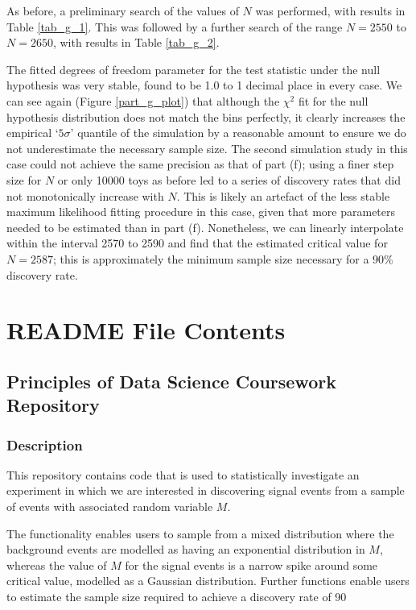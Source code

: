 \documentclass[12pt]{article}
\begin{document}
As before, a preliminary search of the values of $N$ was performed, with results in Table \ref{tab_g_1}.
This was followed by a further search of the range $N=2550$ to $N=2650$, with results in Table \ref{tab_g_2}.

The fitted degrees of freedom parameter for the test statistic under the null hypothesis was very stable, found to be 1.0 to 1 decimal place in every case.
We can see again (Figure \ref{part_g_plot}) that although the $\chi^2$ fit for the null hypothesis distribution does not match the bins perfectly, it clearly increases the empirical `$5\sigma$' quantile of the simulation by a reasonable amount to ensure we do not underestimate the necessary sample size.
The second simulation study in this case could not achieve the same precision as that of part (f); using a finer step size for $N$ or only 10000 toys as before led to a series of discovery rates that did not monotonically increase with $N$.
This is likely an artefact of the less stable maximum likelihood fitting procedure in this case, given that more parameters needed to be estimated than in part (f).
Nonetheless, we can linearly interpolate within the interval 2570 to 2590 and find that the estimated critical value for $N=2587$; this is approximately the minimum sample size necessary for a 90\% discovery rate.



\appendix
\section*{README File Contents}

\subsection*{Principles of Data Science Coursework Repository}

\subsubsection*{Description}
This repository contains code that is used to statistically investigate an experiment in which we are interested in discovering signal events from a sample of events with associated random variable $M$.

The functionality enables users to sample from a mixed distribution where the background events are modelled as having an exponential distribution in $M$, whereas the value of $M$ for the signal events is a narrow spike around some critical value, modelled as a Gaussian distribution. Further functions enable users to estimate the sample size required to achieve a discovery rate of 90%
\end{document}
